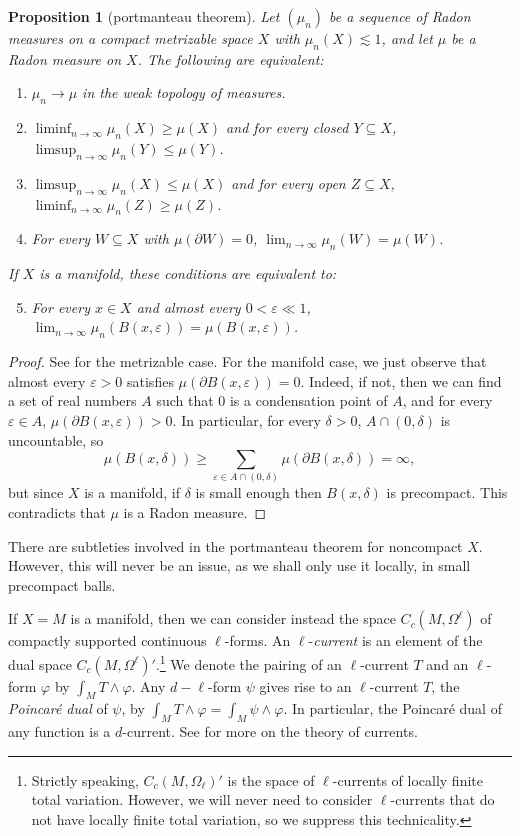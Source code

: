\documentclass[reqno,11pt]{amsart}
\newcommand{\dfn}[1]{\emph{#1}\index{#1}}
\newtheorem{proposition}[theorem]{Proposition}
\theoremstyle{definition}
\numberwithin{equation}{section}
\begin{document}
\begin{proposition}[portmanteau theorem]
	Let $(\mu_n)$ be a sequence of Radon measures on a compact metrizable space $X$ with $\mu_n(X) \lesssim 1$, and let $\mu$ be a Radon measure on $X$. The following are equivalent:
\begin{enumerate}
	\item $\mu_n \to \mu$ in the weak topology of measures.
	\item $\liminf_{n \to \infty} \mu_n(X) \geq \mu(X)$ and for every closed $Y \subseteq X$, $\limsup_{n \to \infty} \mu_n(Y) \leq \mu(Y)$.
	\item $\limsup_{n \to \infty} \mu_n(X) \leq \mu(X)$ and for every open $Z \subseteq X$, $\liminf_{n \to \infty} \mu_n(Z) \geq \mu(Z)$.
	\item For every $W \subseteq X$ with $\mu(\partial W) = 0$, $\lim_{n \to \infty} \mu_n(W) = \mu(W)$.
\end{enumerate}
	If $X$ is a manifold, these conditions are equivalent to:
\begin{enumerate}
	\setcounter{enumi}{4}
	\item For every $x \in X$ and almost every $0 < \varepsilon \ll 1$, $\lim_{n \to \infty} \mu_n(B(x, \varepsilon)) = \mu(B(x, \varepsilon))$.
\end{enumerate}
\end{proposition}
\begin{proof}
	See \cite[Theorem 13.16]{klenke2013probability} for the metrizable case.
	For the manifold case, we just observe that almost every $\varepsilon > 0$ satisfies $\mu(\partial B(x, \varepsilon)) = 0$. Indeed, if not, then we can find a set of real numbers $A$ such that $0$ is a condensation point of $A$, and for every $\varepsilon \in A$, $\mu(\partial B(x, \varepsilon)) > 0$.
	In particular, for every $\delta > 0$, $A \cap (0, \delta)$ is uncountable, so
	$$\mu(B(x, \delta)) \geq \sum_{\varepsilon \in A \cap (0, \delta)} \mu(\partial B(x, \delta)) = \infty,$$
	but since $X$ is a manifold, if $\delta$ is small enough then $B(x, \delta)$ is precompact.
	This contradicts that $\mu$ is a Radon measure.
\end{proof}

There are subtleties involved in the portmanteau theorem for noncompact $X$.
However, this will never be an issue, as we shall only use it locally, in small precompact balls.

If $X = M$ is a manifold, then we can consider instead the space $C_c(M, \Omega^\ell)$ of compactly supported continuous $\ell$-forms.
An $\ell$-\dfn{current} is an element of the dual space $C_c(M, \Omega^\ell)'$.\footnote{Strictly speaking, $C_c(M, \Omega_\ell)'$ is the space of $\ell$-currents of locally finite total variation. However, we will never need to consider $\ell$-currents that do not have locally finite total variation, so we suppress this technicality.}
We denote the pairing of an $\ell$-current $T$ and an $\ell$-form $\varphi$ by $\int_M T \wedge \varphi$.
Any $d-\ell$-form $\psi$ gives rise to an $\ell$-current $T$, the \dfn{Poincar\'e dual} of $\psi$, by $\int_M T \wedge \varphi = \int_M \psi \wedge \varphi$.
In particular, the Poincar\'e dual of any function is a $d$-current.
See \cite{simon1983GMT} for more on the theory of currents.
\end{document}
